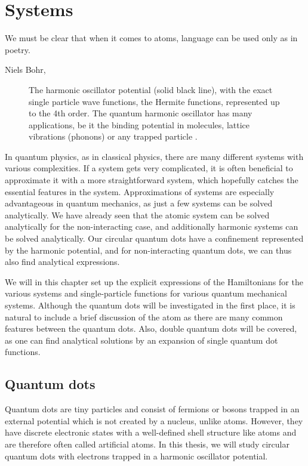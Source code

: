 \chapter{Systems} \label{chp:systems}
\epigraph{We must be clear that when it comes to atoms, language can be used only as in poetry.}{Niels Bohr, \cite{heisenberg_physics_1971}}
\begin{figure}[H]
	\centering
	
	\caption{The harmonic oscillator potential (solid black line), with the exact single particle wave functions, the Hermite functions, represented up to the 4th order. The quantum harmonic oscillator has many applications, be it the binding potential in molecules, lattice vibrations (phonons) or any trapped particle \cite{noauthor_what_nodate}.}
	\label{fig:harmonicoscillator}
\end{figure}

In quantum physics, as in classical physics, there are many different systems with various complexities. If a system gets very complicated, it is often beneficial to approximate it with a more straightforward system, which hopefully catches the essential features in the system. Approximations of systems are especially advantageous in quantum mechanics, as just a few systems can be solved analytically. We have already seen that the atomic system can be solved analytically for the non-interacting case, and additionally harmonic systems can be solved analytically. Our circular quantum dots have a confinement represented by the harmonic potential, and for non-interacting quantum dots, we can thus also find analytical expressions. 

We will in this chapter set up the explicit expressions of the Hamiltonians for the various systems and single-particle functions for various quantum mechanical systems. Although the quantum dots will be investigated in the first place, it is natural to include a brief discussion of the atom as there are many common features between the quantum dots. Also, double quantum dots will be covered, as one can find analytical solutions by an expansion of single quantum dot functions.

\section{Quantum dots} \label{sec:quantumdots}
Quantum dots are tiny particles and consist of fermions or bosons trapped in an external potential which is not created by a nucleus, unlike atoms. However, they have discrete electronic states with a well-defined shell structure like atoms and are therefore often called artificial atoms. In this thesis, we will study circular quantum dots with electrons trapped in a harmonic oscillator potential.

